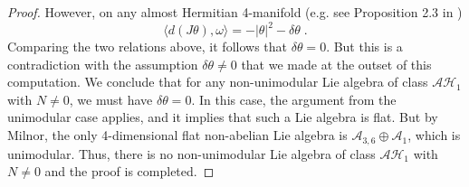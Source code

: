 \documentclass{amsart}
\begin{document}
\begin{proof}
However, on any almost Hermitian 4-manifold (e.g. see Proposition 2.3 in \cite{DS})
$$ \langle d(J\theta) , \omega \rangle = - |\theta|^2 - \delta \theta \; .$$
Comparing the two relations above, it follows that $\delta \theta = 0$. But this is a contradiction with the assumption $\delta \theta \neq 0$ that we made at the outset of this computation. We conclude that for any non-unimodular Lie algebra of class $\mathcal{AH}_1$ with $N \neq 0$, we must have $\delta \theta = 0$. In this case, the argument from the unimodular case applies, and it implies that such a Lie algebra is flat. But by Milnor, the only 4-dimensional flat non-abelian Lie algebra is $\mathcal{A}_{3,6}\oplus \mathcal{A}_1$, which is unimodular. Thus, there is no non-unimodular Lie algebra of class $\mathcal{AH}_1$ with $N \neq 0$ and the proof is completed.



 
\end{proof}
\end{document}
